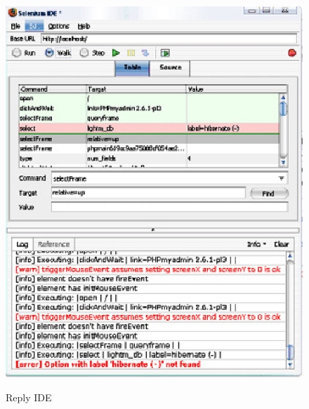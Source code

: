 \documentclass[9pt,twocolumn,twoside]{Gunadarma}
\begin{document}
\begin{figure}[htbp]
	\begin{center}
		\includegraphics[width=1\columnwidth]{IDE-2.eps} \label{fig:1-noFCase1}
	\end{center}
	\caption{Reply IDE}
\end{figure}
\end{document}
